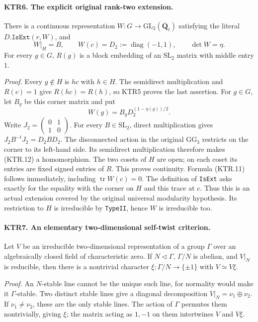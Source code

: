\paragraph{KTR6. The explicit original rank-two extension.}
\label{claim:KTR6}
There is a continuous representation \(W:G\to
\mathrm{GL}_2(\overline{\mathbf Q}_\ell)\) satisfying
the literal \(D.\texttt{IsExt}(r,W)\), and
\[
 W|_H=B,\qquad W(c)=D_2:=\operatorname{diag}(-1,1),
 \qquad \det W=\eta.
 \tag{KTR.11}
\]
For every \(g\in G\), \(R(g)\) is a block embedding of
an \(\mathrm{SL}_2\) matrix with middle entry \(1\).

\emph{Proof.}
Every \(g\notin H\) is \(hc\) with \(h\in H\).
The semidirect multiplication and \(R(c)=1\) give
\(R(hc)=R(h)\), so KTR5 proves the last assertion.
For \(g\in G\), let \(B_g\) be this corner matrix and put
\[
 W(g)=B_gD_2^{(1-\eta(g))/2}.
 \tag{KTR.12}
\]
Write \(J_2=\left(\begin{smallmatrix}0&1\\1&0\end{smallmatrix}\right)\).
For every \(B\in\mathrm{SL}_2\), direct multiplication gives
\(J_2B^{-t}J_2=D_2BD_2\).  The disconnected action in the
original \(\mathrm{GG}_3\) restricts on the corner to its
left-hand side.  Its semidirect multiplication therefore makes
(KTR.12) a homomorphism.  The two cosets of \(H\) are open;
on each coset its entries are fixed signed entries of \(R\).
This proves continuity.  Formula (KTR.11) follows immediately,
including \(\operatorname{tr}W(c)=0\).
The definition of \texttt{IsExt} asks exactly for the equality
with the corner on \(H\) and this trace at \(c\).
Thus this is an actual extension covered by the original universal
modularity hypothesis.  Its restriction to \(H\) is irreducible
by \texttt{TypeII}, hence \(W\) is irreducible too.

\paragraph{KTR7. An elementary two-dimensional self-twist criterion.}
\label{claim:KTR7}
Let \(V\) be an irreducible two-dimensional representation of
a group \(\Gamma\) over an algebraically closed field of
characteristic zero.  If \(N\lhd\Gamma\), \(\Gamma/N\)
is abelian, and \(V|_N\) is reducible, then there is a
nontrivial character \(\xi:\Gamma/N\to\{\pm1\}\) with
\(V\simeq V\xi\).

\emph{Proof.}
An \(N\)-stable line cannot be the unique such line, for
normality would make it \(\Gamma\)-stable.  Two distinct
stable lines give a diagonal decomposition
\(V|_N=\nu_1\oplus\nu_2\).
If \(\nu_1\ne\nu_2\), these are the only stable lines.
The action of \(\Gamma\) permutes them nontrivially, giving
\(\xi\); the matrix acting as \(1,-1\) on them intertwines
\(V\) and \(V\xi\).


